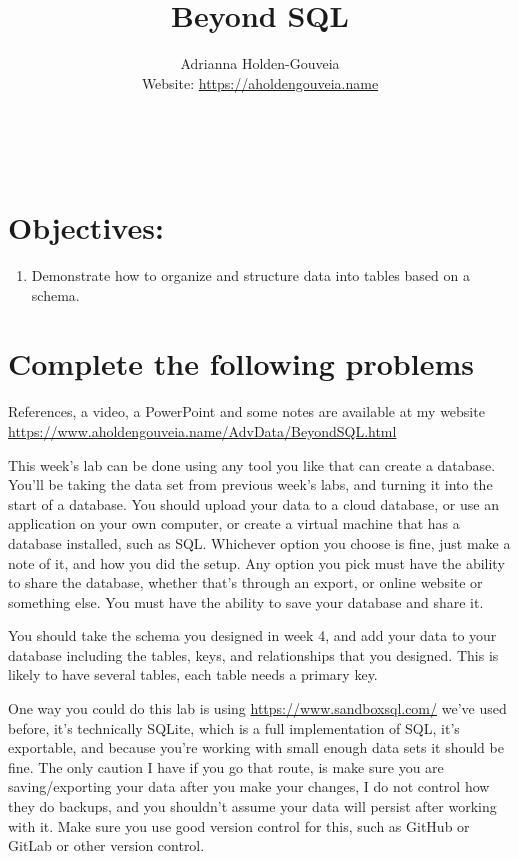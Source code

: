 \documentclass[12pt]{article}
\title{Beyond SQL}
\author{
        Adrianna Holden-Gouveia \\
        Website: \url{https://aholdengouveia.name}\\ 
        \date{\vspace{-5ex}}
        \faLinkedin{: aholdengouveia} \\
        \faGithub {: aholdengouveia} \\
        }
\begin{document}
    

\maketitle


\section*{Objectives:}
\begin{enumerate}
    \item Demonstrate how to organize and structure data into tables based on a schema.
\end{enumerate}
\section*{Complete the following problems}

References, a video, a PowerPoint and some notes are available at my website
\url {https://www.aholdengouveia.name/AdvData/BeyondSQL.html}

This week's lab can be done using any tool you like that can create a database.  You'll be taking the data set from previous week's labs, and turning it into the start of a database.  You should upload your data to a cloud database, or use an application on your own computer, or create a virtual machine that has a database installed, such as SQL.  Whichever option you choose is fine, just make a note of it, and how you did the setup.  Any option you pick must have the ability to share the database, whether that's through an export, or online website or something else.  You must have the ability to save your database and share it. 

You should take the schema you designed in week 4, and add your data to your database including the tables, keys, and relationships that you designed.  This is likely to have several tables, each table needs a primary key. 

One way you could do this lab is using \url{https://www.sandboxsql.com/} we've used before, it's technically SQLite, which is a full implementation of SQL, it's exportable, and because you're working with small enough data sets it should be fine.  The only caution I have if you go that route, is make sure you are saving/exporting your data after you make your changes, I do not control how they do backups, and you shouldn't assume your data will persist after working with it.  Make sure you use good version control for this, such as GitHub or GitLab or other version control.  
\end{document}
